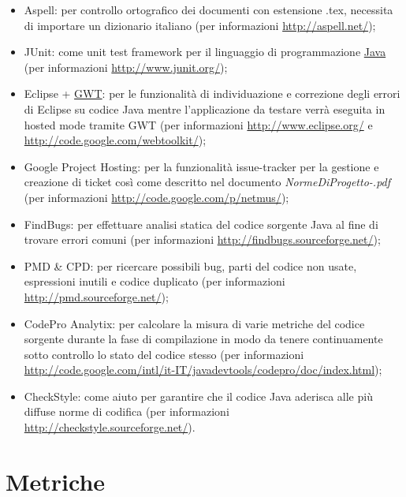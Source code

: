 \begin{itemize}

\item Aspell: per controllo ortografico dei
documenti con estensione .tex, necessita di importare un dizionario italiano
(per informazioni \url{http://aspell.net/});

\item JUnit: come unit test framework per il linguaggio di
programmazione \underline{Java} (per informazioni
\url{http://www.junit.org/});

\item Eclipse + \underline{GWT}: per le funzionalit\`a di individuazione e
correzione degli errori di Eclipse su codice Java mentre l'applicazione da
testare verr\`a eseguita in hosted mode tramite GWT (per informazioni \url{http://www.eclipse.org/} e
\url{http://code.google.com/webtoolkit/});

\item Google Project Hosting: per la funzionalit\`a issue-tracker
per la gestione e creazione di ticket cos\`i come descritto nel documento
\emph{NormeDiProgetto-\versionenormeprogetto.pdf} (per informazioni
\url{http://code.google.com/p/netmus/});

\item FindBugs: per effettuare analisi statica del codice
sorgente Java al fine di trovare errori comuni (per informazioni
\url{http://findbugs.sourceforge.net/});

\item PMD \& CPD: per ricercare possibili bug, parti del codice non usate,
espressioni inutili e codice duplicato (per informazioni
\url{http://pmd.sourceforge.net/});

\item CodePro Analytix: per calcolare la misura di varie metriche del
codice sorgente durante la fase di compilazione in modo da tenere continuamente
sotto controllo lo stato del codice stesso (per informazioni
\url{http://code.google.com/intl/it-IT/javadevtools/codepro/doc/index.html});

\item CheckStyle: come aiuto per garantire che il codice Java
aderisca alle pi\`u diffuse norme di codifica (per informazioni
\url{http://checkstyle.sourceforge.net/}).
\end{itemize}


\section{Metriche}

